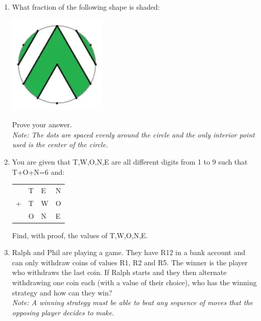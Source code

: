 \documentclass{article}
\begin{document}
\begin{enumerate}[1.]
\item What fraction of the following shape is shaded:
	\begin{center}
	\includegraphics[scale=1.0]{beginner_test_1_img_1.png}	
	\end{center}
Prove your answer.\\
\textit{Note: The dots are spaced evenly around the circle and the only interior point used is the center of the circle.}


\item You are given that T,W,O,N,E are all different digits from 1 to 9 such that T+O+N=6 and:
\begin{center}
\begin{tabular}{m{1cm} m{0.5cm} m{0.5cm} m{0.5cm}}
&T&E&N\\
+&T&W&O\\
\hline
&O&N&E\\
\hline
\end{tabular}
\end{center}
Find, with proof, the values of T,W,O,N,E.


\item Ralph and Phil are playing a game. They have R12 in a bank account and can only withdraw coins of values R1, R2 and R5. The winner is the player who withdraws the last coin. If Ralph starts and they then alternate withdrawing one coin each (with a value of their choice), who has the winning strategy and how can they win?\\
\textit{Note: A winning strategy must be able to beat any sequence of moves that the opposing player decides to make.}



\end{enumerate}
\end{document}
